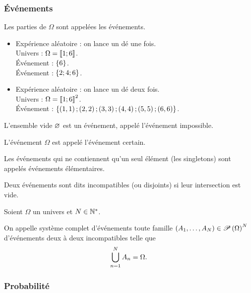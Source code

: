\subsubsection{Événements}

Les parties de \(\Omega\) sont appelées les événements.

\begin{ex}
\begin{itemize}
    \item Expérience aléatoire : on lance un dé une fois. \\ Univers : \(\Omega=\left\llbracket1;6\right\rrbracket\). \\ Événement  : \(\left\lbrace6\right\rbrace\). \\ Événement  : \(\left\lbrace2;4;6\right\rbrace\). \\
    \item Expérience aléatoire : on lance un dé deux fois. \\ Univers : \(\Omega=\left\llbracket1;6\right\rrbracket^2\). \\ Événement  : \(\left\lbrace\left(1,1\right);\left(2,2\right);\left(3,3\right);\left(4,4\right);\left(5,5\right);\left(6,6\right)\right\rbrace\).
\end{itemize}
\end{ex}

\begin{defi}
L'ensemble vide \(\varnothing\) est un événement, appelé l'événement impossible.

L'événement \(\Omega\) est appelé l'événement certain.

Les événements qui ne contiennent qu'un seul élément (\ie les singletons) sont appelés événements élémentaires.
\end{defi}

\begin{defi}
Deux événements sont dits incompatibles (ou disjoints) si leur intersection est vide.
\end{defi}

\begin{defi}
Soient \(\Omega\) un univers et \(N\in\mathbb{N}^*\).

On appelle système complet d'événements toute famille \(\left(A_1,\dots,A_N\right)\in\mathscr{P}\left(\Omega\right)^N\) d'événements deux à deux incompatibles telle que \[\bigcup_{n=1}^NA_n=\Omega.\]
\end{defi}

\subsubsection{Probabilité}

